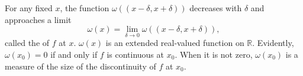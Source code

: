 For any fixed $x$, the function $\omega((x - \delta, x + \delta))$ decreases with $\delta$ and approaches a limit
$$\omega(x) = \lim_{\delta \to 0} \omega((x - \delta, x + \delta)),$$
called the  of $f$ at $x$. $\omega(x)$ is an extended real-valued function on $\mathbb{R}$. Evidently, $\omega(x_0) = 0$ if and only if $f$ is continuous at $x_0$. When it is not zero, $\omega(x_0)$ is a measure of the size of the discontinuity of $f$ at $x_0$.

